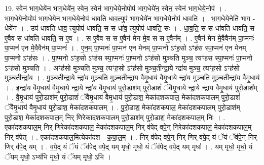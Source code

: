 \documentclass[17pt]{extarticle}
\begin{document}
19. स्वेन॑ भाग॒धेये॑न भाग॒धेये॑न॒ स्वेन॒ स्वेन॑ भाग॒धेये॒नोपोप॑ भाग॒धेये॑न॒ स्वेन॒ स्वेन॑ भाग॒धेये॒नोप॑ । . भा॒ग॒धेये॒नोपोप॑ भाग॒धेये॑न भाग॒धेये॒नोप॑ धावति धाव॒त्युप॑ भाग॒धेये॑न भाग॒धेये॒नोप॑ धावति । . भा॒ग॒धेये॒नेति॑ भाग - धेये॑न । . उप॑ धावति धाव॒ त्युपोप॑ धावति॒ स स धा॑व॒ त्युपोप॑ धावति॒ सः । . धा॒व॒ति॒ स स धा॑वति धावति॒ स ए॒वैव स धा॑वति धावति॒ स ए॒व । . स ए॒वैव स स ए॒वैन॑ मेन मे॒व स स ए॒वैन᳚म् । . ए॒वैन॑ मेन मे॒वैवैन॑म् पा॒प्मनः॑ पा॒प्मन॑ एन मे॒वैवैन॑म् पा॒प्मनः॑ । . ए॒न॒म् पा॒प्मनः॑ पा॒प्मन॑ एन मेनम् पा॒प्मनो ऽꣳह॒सो ऽꣳह॑स स्पा॒प्मन॑ एन मेनम् पा॒प्मनो ऽꣳह॑सः । . पा॒प्मनो ऽꣳह॒सो ऽꣳह॑स स्पा॒प्मनः॑ पा॒प्मनो ऽꣳह॑सो मुञ्चति मुञ्च॒ त्यꣳह॑स स्पा॒प्मनः॑ पा॒प्मनो ऽꣳह॑सो मुञ्चति । . अꣳह॑सो मुञ्चति मुञ्च॒ त्यꣳह॒सो ऽꣳह॑सो मुञ्च॒तीन्द्रा॒ये न्द्रा॑य मुञ्च॒ त्यꣳह॒सो ऽꣳह॑सो मुञ्च॒तीन्द्रा॑य । . मु॒ञ्च॒तीन्द्रा॒ये न्द्रा॑य मुञ्चति मुञ्च॒तीन्द्रा॑य वैमृ॒धाय॑ वैमृ॒धाये न्द्रा॑य मुञ्चति मुञ्च॒तीन्द्रा॑य वैमृ॒धाय॑ । . इन्द्रा॑य वैमृ॒धाय॑ वैमृ॒धाये न्द्रा॒ये न्द्रा॑य वैमृ॒धाय॑ पुरो॒डाश॑म् पुरो॒डाशं॑ ॅवैमृ॒धाये न्द्रा॒ये न्द्रा॑य वैमृ॒धाय॑ पुरो॒डाश᳚म् । . वै॒मृ॒धाय॑ पुरो॒डाश॑म् पुरो॒डाशं॑ ॅवैमृ॒धाय॑ वैमृ॒धाय॑ पुरो॒डाश॒ मेका॑दशकपाल॒ मेका॑दशकपालम् पुरो॒डाशं॑ ॅवैमृ॒धाय॑ वैमृ॒धाय॑ पुरो॒डाश॒ मेका॑दशकपालम् । . पु॒रो॒डाश॒ मेका॑दशकपाल॒ मेका॑दशकपालम् पुरो॒डाश॑म् पुरो॒डाश॒ मेका॑दशकपाल॒म् निर् णिरेका॑दशकपालम् पुरो॒डाश॑म् पुरो॒डाश॒ मेका॑दशकपाल॒म् निः । . एका॑दशकपाल॒म् निर् णिरेका॑दशकपाल॒ मेका॑दशकपाल॒म् निर् व॑पेद् वपे॒न् निरेका॑दशकपाल॒ मेका॑दशकपाल॒म् निर् व॑पेत् । . एका॑दशकपाल॒मित्येका॑दश - क॒पा॒ल॒म् । . निर् व॑पेद् वपे॒न् निर् णिर् व॑पे॒द् यं ॅयं ॅव॑पे॒न् निर् णिर् व॑पे॒द् यम् । . व॒पे॒द् यं ॅयं ॅव॑पेद् वपे॒द् यम् मृधो॒ मृधो॒ यं ॅव॑पेद् वपे॒द् यम् मृधः॑ । . यम् मृधो॒ मृधो॒ यं ॅयम् मृधो॒ ऽभ्य॑भि मृधो॒ यं ॅयम् मृधो॒ ऽभि । \newline
\end{document}
